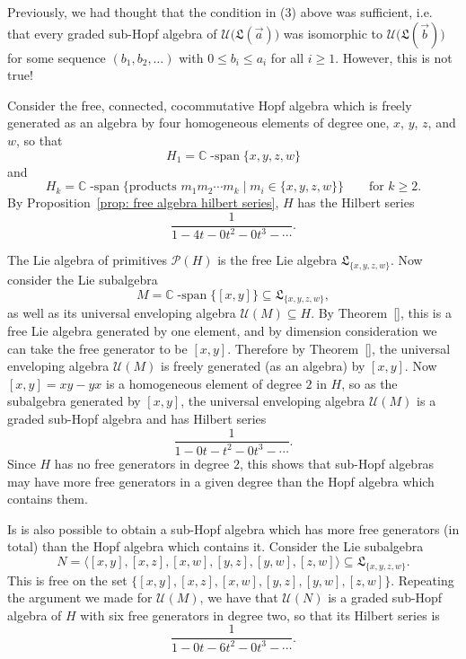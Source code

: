 \documentclass[11pt]{amsart}
\theoremstyle{definition}
\numberwithin{equation}{section}
\def\CC{{\mathbb C}}
\newcommand{\lucas}[1]{\todo[size=\tiny,color=red!50]{#1 \\ \hfill --- Lucas}}
\begin{document}
Previously, we had thought that the condition in (3) above was sufficient, i.e. that every graded sub-Hopf algebra of $\mathcal{U}\big(\mathfrak{L}(\vec{a})\big)$ was isomorphic to $\mathcal{U}\big(\mathfrak{L}(\vec{b})\big)$ for some sequence $(b_{1}, b_{2}, \ldots)$ with $0 \le b_{i} \le a_{i}$ for all $i \ge 1$.  However, this is not true!  

Consider the free, connected, cocommutative Hopf algebra which is freely generated as an algebra by four homogeneous elements of degree one, $x$, $y$, $z$, and $w$, so that
\[
H_{1} = \CC\operatorname{-span}\{x, y, z, w\}
\]
and
\[
H_{k} = \CC\operatorname{-span}\big\{ \text{products $m_{1} m_{2} \cdots m_{k}$} \;|\; m_{i} \in \{x, y, z, w\} \big\}
\qquad\text{for $k \ge 2$}.
\]
By Proposition~\ref{prop: free algebra hilbert series}, $H$ has the Hilbert series
\[
\frac{1}{1 - 4t - 0 t^{2} - 0 t^{3} - \cdots }.
\]

The Lie algebra of primitives $\mathcal{P}(H)$ is the free Lie algebra $\mathfrak{L}_{\{x, y, z, w\}}$.  Now consider the Lie subalgebra
\[
M = \CC\operatorname{-span}\{[x, y]\} \subseteq \mathfrak{L}_{\{x, y, z, w\}},
\]
as well as its universal enveloping algebra $\mathcal{U}(M) \subseteq H$.
By Theorem~\ref{}, this is a free Lie algebra generated by one element, and by dimension consideration we can take the free generator to be $[x, y]$.  
Therefore by Theorem~\ref{}, the universal enveloping algebra $\mathcal{U}(M)$ is freely generated (as an algebra) by $[x, y]$.
Now $[x, y] = xy - yx$ is a homogeneous element of degree $2$ in $H$, so as the subalgebra generated by $[x, y]$, the universal enveloping algebra $\mathcal{U}(M)$ is a graded sub-Hopf algebra and has Hilbert series
\[
\frac{1}{1 - 0t - t^{2} - 0t^{3} - \cdots}.
\]
Since $H$ has no free generators in degree $2$, this shows that sub-Hopf algebras may have more free generators in a given degree than the Hopf algebra which contains them.

Is is also possible to obtain a sub-Hopf algebra which has more free generators (in total) than the Hopf algebra which contains it.  
Consider the Lie subalgebra
\[
N = \langle [x, y], [x, z], [x, w], [y, z], [y, w], [z, w] \rangle \subseteq \mathfrak{L}_{\{x, y, z, w\}}.
\]
This is free on the set $\{[x, y], [x, z], [x, w], [y, z], [y, w], [z, w]\}$.  \lucas{Definitely true, but details needed.}  Repeating the argument we made for $\mathcal{U}(M)$, we have that $\mathcal{U}(N)$ is a graded sub-Hopf algebra of $H$ with six free generators in degree two, so that its Hilbert series is
\[
\frac{1}{1 - 0t - 6t^{2} - 0 t^{3} - \cdots }.
\]
\end{document}

